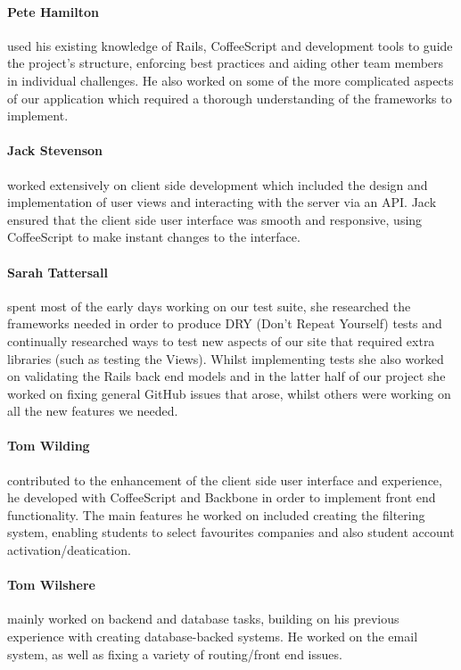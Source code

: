     \paragraph{Pete Hamilton} used his existing knowledge of Rails, CoffeeScript and development tools to guide the project's structure, enforcing best practices and aiding other team members in individual challenges. He also worked on some of the more complicated aspects of our application which required a thorough understanding of the frameworks to implement.
    \paragraph{Jack Stevenson} worked extensively on client side development which included the design and implementation of user views and interacting with the server via an API. Jack ensured that the client side user interface was smooth and responsive, using CoffeeScript to make instant changes to the interface.
    \paragraph{Sarah Tattersall} spent most of the early days working on our test suite, she researched the frameworks needed in order to produce DRY (Don't Repeat Yourself) tests and continually researched ways to test new aspects of our site that required extra libraries (such as testing the Views).
    Whilst implementing tests she also worked on validating the Rails back end models and in the latter half of our project she worked on fixing general GitHub issues that arose, whilst others were working on all the new features we needed.
    \paragraph{Tom Wilding} contributed to the enhancement of the client side user interface and experience, he developed with CoffeeScript and Backbone in order to implement front end functionality. The main features he worked on included creating the filtering system, enabling students to select favourites companies and also student account activation/deatication.
    \paragraph{Tom Wilshere} mainly worked on backend and database tasks, building on his previous experience with creating database-backed systems. He worked on the email system, as well as fixing a variety of routing/front end issues.
